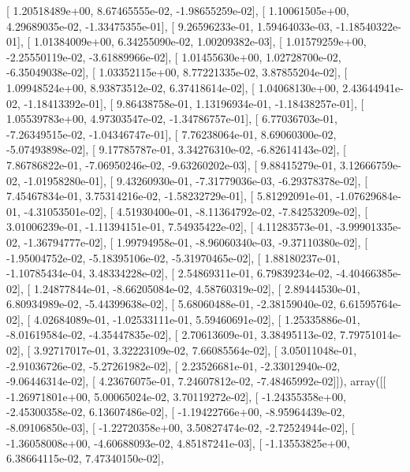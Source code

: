 \documentclass{article}
\begin{document}
       [  1.20518489e+00,   8.67465555e-02,  -1.98655259e-02],
       [  1.10061505e+00,   4.29689035e-02,  -1.33475355e-01],
       [  9.26596233e-01,   1.59464033e-03,  -1.18540322e-01],
       [  1.01384009e+00,   6.34255090e-02,   1.00209382e-03],
       [  1.01579259e+00,  -2.25550119e-02,  -3.61889966e-02],
       [  1.01455630e+00,   1.02728700e-02,  -6.35049038e-02],
       [  1.03352115e+00,   8.77221335e-02,   3.87855204e-02],
       [  1.09948524e+00,   8.93873512e-02,   6.37418614e-02],
       [  1.04068130e+00,   2.43644941e-02,  -1.18413392e-01],
       [  9.86438758e-01,   1.13196934e-01,  -1.18438257e-01],
       [  1.05539783e+00,   4.97303547e-02,  -1.34786757e-01],
       [  6.77036703e-01,  -7.26349515e-02,  -1.04346747e-01],
       [  7.76238064e-01,   8.69060300e-02,  -5.07493898e-02],
       [  9.17785787e-01,   3.34276310e-02,  -6.82614143e-02],
       [  7.86786822e-01,  -7.06950246e-02,  -9.63260202e-03],
       [  9.88415279e-01,   3.12666759e-02,  -1.01958280e-01],
       [  9.43260930e-01,  -7.31779036e-03,  -6.29378378e-02],
       [  7.45467834e-01,   3.75314216e-02,  -1.58232729e-01],
       [  5.81292091e-01,  -1.07629684e-01,  -4.31053501e-02],
       [  4.51930400e-01,  -8.11364792e-02,  -7.84253209e-02],
       [  3.01006239e-01,  -1.11394151e-01,   7.54935422e-02],
       [  4.11283573e-01,  -3.99901335e-02,  -1.36794777e-02],
       [  1.99794958e-01,  -8.96060340e-03,  -9.37110380e-02],
       [ -1.95004752e-02,  -5.18395106e-02,  -5.31970465e-02],
       [  1.88180237e-01,  -1.10785434e-04,   3.48334228e-02],
       [  2.54869311e-01,   6.79839234e-02,  -4.40466385e-02],
       [  1.24877844e-01,  -8.66205084e-02,   4.58760319e-02],
       [  2.89444530e-01,   6.80934989e-02,  -5.44399638e-02],
       [  5.68060488e-01,  -2.38159040e-02,   6.61595764e-02],
       [  4.02684089e-01,  -1.02533111e-01,   5.59460691e-02],
       [  1.25335886e-01,  -8.01619584e-02,  -4.35447835e-02],
       [  2.70613609e-01,   3.38495113e-02,   7.79751014e-02],
       [  3.92717017e-01,   3.32223109e-02,   7.66085564e-02],
       [  3.05011048e-01,  -2.91036726e-02,  -5.27261982e-02],
       [  2.23526681e-01,  -2.33012940e-02,  -9.06446314e-02],
       [  4.23676075e-01,   7.24607812e-02,  -7.48465992e-02]]), array([[ -1.26971801e+00,   5.00065024e-02,   3.70119272e-02],
       [ -1.24355358e+00,  -2.45300358e-02,   6.13607486e-02],
       [ -1.19422766e+00,  -8.95964439e-02,  -8.09106850e-03],
       [ -1.22720358e+00,   3.50827474e-02,  -2.72524944e-02],
       [ -1.36058008e+00,  -4.60688093e-02,   4.85187241e-03],
       [ -1.13553825e+00,   6.38664115e-02,   7.47340150e-02],
\end{document}
